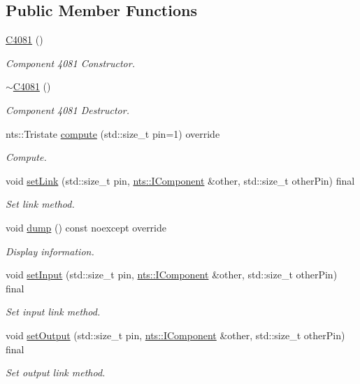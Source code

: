 \subsection*{Public Member Functions}
\begin{DoxyCompactItemize}
\item 
\mbox{\hyperlink{classC4081_afa84f979826cb257f236fee5a92b4af6}{C4081}} ()
\begin{DoxyCompactList}\small\item\em Component 4081 Constructor. \end{DoxyCompactList}\item 
\mbox{\label{classC4081_a960a6a35c939ebd584d54a7b54daa0a7}} 
\mbox{\hyperlink{classC4081_a960a6a35c939ebd584d54a7b54daa0a7}{$\sim$\+C4081}} ()
\begin{DoxyCompactList}\small\item\em Component 4081 Destructor. \end{DoxyCompactList}\item 
nts\+::\+Tristate \mbox{\hyperlink{classC4081_a1c32e380468dd0ccfe9da7fa6432d31a}{compute}} (std\+::size\+\_\+t pin=1) override
\begin{DoxyCompactList}\small\item\em Compute. \end{DoxyCompactList}\item 
void \mbox{\hyperlink{classC4081_a21e38e780f876bcbee9e522e621654a3}{set\+Link}} (std\+::size\+\_\+t pin, \mbox{\hyperlink{classnts_1_1IComponent}{nts\+::\+I\+Component}} \&other, std\+::size\+\_\+t other\+Pin) final
\begin{DoxyCompactList}\small\item\em Set link method. \end{DoxyCompactList}\item 
void \mbox{\hyperlink{classC4081_a0ef9e2164c25c6aed2f2e3a54d7417fa}{dump}} () const noexcept override
\begin{DoxyCompactList}\small\item\em Display information. \end{DoxyCompactList}\item 
void \mbox{\hyperlink{classC4081_a21323fd9bab910718335dc009b2b90c2}{set\+Input}} (std\+::size\+\_\+t pin, \mbox{\hyperlink{classnts_1_1IComponent}{nts\+::\+I\+Component}} \&other, std\+::size\+\_\+t other\+Pin) final
\begin{DoxyCompactList}\small\item\em Set input link method. \end{DoxyCompactList}\item 
void \mbox{\hyperlink{classC4081_af17058a91dbb223bf38c745cd7287557}{set\+Output}} (std\+::size\+\_\+t pin, \mbox{\hyperlink{classnts_1_1IComponent}{nts\+::\+I\+Component}} \&other, std\+::size\+\_\+t other\+Pin) final
\begin{DoxyCompactList}\small\item\em Set output link method. \end{DoxyCompactList}\end{DoxyCompactItemize}
